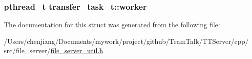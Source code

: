 \subsubsection[{worker}]{\setlength{\rightskip}{0pt plus 5cm}pthread\+\_\+t transfer\+\_\+task\+\_\+t\+::worker}\label{structtransfer__task__t_a0771c021831d5adc65590d6cfc3cf2eb}


The documentation for this struct was generated from the following file\+:\begin{DoxyCompactItemize}
\item 
/\+Users/chenjiang/\+Documents/mywork/project/github/\+Team\+Talk/\+T\+T\+Server/cpp/src/file\+\_\+server/\hyperlink{file__server__util_8h}{file\+\_\+server\+\_\+util.\+h}\end{DoxyCompactItemize}

